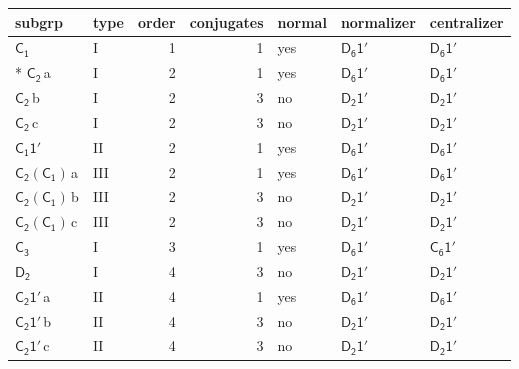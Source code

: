 \documentclass[10pt,a4paper]{article}
\numberwithin{equation}{section}
\newcommand{\grp}[1]{\mathsf{#1}}
\newcommand{\clsletter}[1]{\,{\scriptsize\color{black!55}#1}}
\begin{document}
{\small\begin{longtable}{@{}llrrlll@{}}\toprule
subgrp & type & order & conjugates & normal & normalizer & centralizer\\\midrule\endhead
\bottomrule\endfoot\endlastfoot
\href{../../../rotation/data/pdf/C1.pdf}{$\grp{C_{1}}$} & I & 1 & 1 & yes & \href{D6-1p.pdf}{$\grp{D_{6}1'}$} & \href{D6-1p.pdf}{$\grp{D_{6}1'}$}\\*
\href{../../../rotation/data/pdf/C2.pdf}{$\grp{C_{2}}$}\clsletter{a} & I & 2 & 1 & yes & \href{D6-1p.pdf}{$\grp{D_{6}1'}$} & \href{D6-1p.pdf}{$\grp{D_{6}1'}$}\\
\href{../../../rotation/data/pdf/C2.pdf}{$\grp{C_{2}}$}\clsletter{b} & I & 2 & 3 & no & \href{D2-1p.pdf}{$\grp{D_{2}1'}$} & \href{D2-1p.pdf}{$\grp{D_{2}1'}$}\\
\href{../../../rotation/data/pdf/C2.pdf}{$\grp{C_{2}}$}\clsletter{c} & I & 2 & 3 & no & \href{D2-1p.pdf}{$\grp{D_{2}1'}$} & \href{D2-1p.pdf}{$\grp{D_{2}1'}$}\\
\href{C1-1p.pdf}{$\grp{C_{1}1'}$} & II & 2 & 1 & yes & \href{D6-1p.pdf}{$\grp{D_{6}1'}$} & \href{D6-1p.pdf}{$\grp{D_{6}1'}$}\\
\href{C2-C1.pdf}{$\grp{C_{2}}(\grp{C_{1}})$}\clsletter{a} & III & 2 & 1 & yes & \href{D6-1p.pdf}{$\grp{D_{6}1'}$} & \href{D6-1p.pdf}{$\grp{D_{6}1'}$}\\
\href{C2-C1.pdf}{$\grp{C_{2}}(\grp{C_{1}})$}\clsletter{b} & III & 2 & 3 & no & \href{D2-1p.pdf}{$\grp{D_{2}1'}$} & \href{D2-1p.pdf}{$\grp{D_{2}1'}$}\\
\href{C2-C1.pdf}{$\grp{C_{2}}(\grp{C_{1}})$}\clsletter{c} & III & 2 & 3 & no & \href{D2-1p.pdf}{$\grp{D_{2}1'}$} & \href{D2-1p.pdf}{$\grp{D_{2}1'}$}\\
\href{../../../rotation/data/pdf/C3.pdf}{$\grp{C_{3}}$} & I & 3 & 1 & yes & \href{D6-1p.pdf}{$\grp{D_{6}1'}$} & \href{C6-1p.pdf}{$\grp{C_{6}1'}$}\\
\href{../../../rotation/data/pdf/D2.pdf}{$\grp{D_{2}}$} & I & 4 & 3 & no & \href{D2-1p.pdf}{$\grp{D_{2}1'}$} & \href{D2-1p.pdf}{$\grp{D_{2}1'}$}\\
\href{C2-1p.pdf}{$\grp{C_{2}1'}$}\clsletter{a} & II & 4 & 1 & yes & \href{D6-1p.pdf}{$\grp{D_{6}1'}$} & \href{D6-1p.pdf}{$\grp{D_{6}1'}$}\\
\href{C2-1p.pdf}{$\grp{C_{2}1'}$}\clsletter{b} & II & 4 & 3 & no & \href{D2-1p.pdf}{$\grp{D_{2}1'}$} & \href{D2-1p.pdf}{$\grp{D_{2}1'}$}\\
\href{C2-1p.pdf}{$\grp{C_{2}1'}$}\clsletter{c} & II & 4 & 3 & no & \href{D2-1p.pdf}{$\grp{D_{2}1'}$} & \href{D2-1p.pdf}{$\grp{D_{2}1'}$}\\

\end{longtable}}
\end{document}
